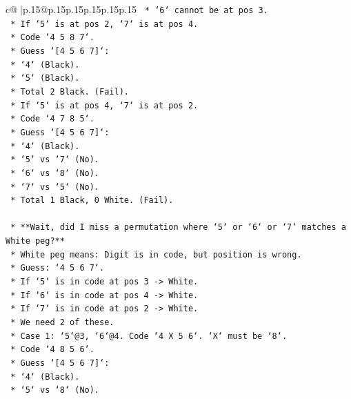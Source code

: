 \documentclass{article}
\begin{document}
{\begin{supertabular}{c@{$\;$}|p{.15\linewidth}@{}p{.15\linewidth}p{.15\linewidth}p{.15\linewidth}p{.15\linewidth}p{.15\linewidth}}
{{{\texttt{            *   `6` cannot be at pos 3.} \\
\texttt{            *   If `5` is at pos 2, `7` is at pos 4.} \\
\texttt{            *   Code `4 5 8 7`.} \\
\texttt{            *   Guess `{[}4 5 6 7{]}`:} \\
\texttt{                *   `4` (Black).} \\
\texttt{                *   `5` (Black).} \\
\texttt{                *   Total 2 Black. (Fail).} \\
\texttt{            *   If `5` is at pos 4, `7` is at pos 2.} \\
\texttt{            *   Code `4 7 8 5`.} \\
\texttt{            *   Guess `{[}4 5 6 7{]}`:} \\
\texttt{                *   `4` (Black).} \\
\texttt{                *   `5` vs `7` (No).} \\
\texttt{                *   `6` vs `8` (No).} \\
\texttt{                *   `7` vs `5` (No).} \\
\texttt{                *   Total 1 Black, 0 White. (Fail).} \\
\\ 
\texttt{    *   **Wait, did I miss a permutation where `5` or `6` or `7` matches a White peg?**} \\
\texttt{        *   White peg means: Digit is in code, but position is wrong.} \\
\texttt{        *   Guess: `4 5 6 7`.} \\
\texttt{        *   If `5` is in code at pos 3 {-}> White.} \\
\texttt{        *   If `6` is in code at pos 4 {-}> White.} \\
\texttt{        *   If `7` is in code at pos 2 {-}> White.} \\
\texttt{        *   We need 2 of these.} \\
\texttt{        *   Case 1: `5`@3, `6`@4. Code `4 X 5 6`. `X` must be `8`.} \\
\texttt{            *   Code `4 8 5 6`.} \\
\texttt{            *   Guess `{[}4 5 6 7{]}`:} \\
\texttt{                *   `4` (Black).} \\
\texttt{                *   `5` vs `8` (No).} \\
}}}
\end{supertabular}}
\end{document}
